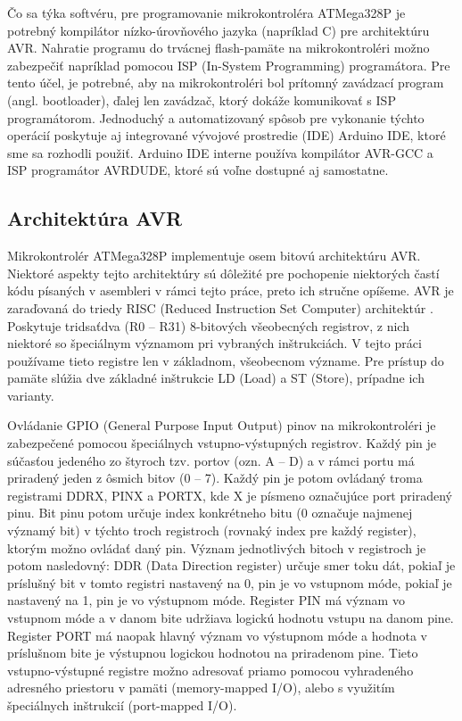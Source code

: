 Čo sa týka softvéru, pre programovanie mikrokontroléra ATMega328P je potrebný kompilátor nízko-úrovňového jazyka (napríklad C) pre architektúru AVR. Nahratie programu do trvácnej flash-pamäte na mikrokontroléri možno zabezpečiť napríklad pomocou ISP (In-System Programming) programátora. Pre tento účel, je potrebné, aby na mikrokontroléri bol prítomný zavádzací program (angl. bootloader), ďalej len zavádzač, ktorý dokáže komunikovať s ISP programátorom. Jednoduchý a automatizovaný spôsob pre vykonanie týchto operácií poskytuje aj integrované vývojové prostredie (IDE) Arduino IDE, ktoré sme sa rozhodli použiť. Arduino IDE interne používa kompilátor AVR-GCC a ISP programátor AVRDUDE, ktoré sú voľne dostupné aj samostatne.

\subsection{Architektúra AVR}
Mikrokontrolér ATMega328P implementuje osem bitovú architektúru AVR. Niektoré aspekty tejto architektúry sú dôležité pre pochopenie niektorých častí kódu písaných v asembleri v rámci tejto práce, preto ich stručne opíšeme. AVR je zaraďovaná do triedy RISC (Reduced Instruction Set Computer) architektúr \cite{avrInstruction}. Poskytuje tridsaťdva (R0 -- R31) 8-bitových všeobecných registrov, z nich niektoré so špeciálnym významom pri vybraných inštrukciách. V tejto práci používame tieto registre len v základnom, všeobecnom význame. Pre prístup do pamäte slúžia dve základné inštrukcie LD (Load) a ST (Store), prípadne ich varianty. 

Ovládanie GPIO (General Purpose Input Output) pinov na mikrokontroléri je zabezpečené pomocou špeciálnych vstupno-výstupných registrov. Každý pin je súčasťou jedeného zo štyroch tzv. portov (ozn. A -- D) a v rámci portu má priradený jeden z ôsmich bitov (0 -- 7). Každý pin je potom ovládaný troma registrami DDRX, PINX a PORTX, kde X je písmeno označujúce port priradený pinu. Bit pinu potom určuje index konkrétneho bitu (0 označuje najmenej významý bit) v týchto troch registroch (rovnaký index pre každý register), ktorým možno ovládať daný pin. Význam jednotlivých bitoch v registroch je potom nasledovný: DDR (Data Direction register) určuje smer toku dát, pokiaľ je príslušný bit v tomto registri nastavený na 0, pin je vo vstupnom móde, pokiaľ je nastavený na 1, pin je vo výstupnom móde. Register PIN má význam vo vstupnom móde a v danom bite udržiava logickú hodnotu vstupu na danom pine. Register PORT má naopak hlavný význam vo výstupnom móde a hodnota v príslušnom bite je výstupnou logickou hodnotou na priradenom pine. Tieto vstupno-výstupné registre možno adresovať priamo pomocou vyhradeného adresného priestoru v pamäti (memory-mapped I/O), alebo s využitím špeciálnych inštrukcií (port-mapped I/O).

